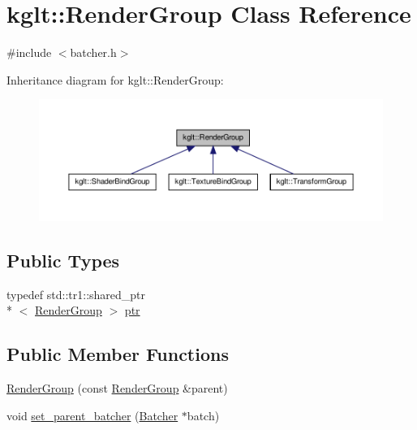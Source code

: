 \hypertarget{classkglt_1_1_render_group}{\section{kglt\-:\-:Render\-Group Class Reference}
\label{classkglt_1_1_render_group}
}


{\ttfamily \#include $<$batcher.\-h$>$}



Inheritance diagram for kglt\-:\-:Render\-Group\-:\nopagebreak
\begin{figure}[H]
\begin{center}
\leavevmode
\includegraphics[width=350pt]{classkglt_1_1_render_group__inherit__graph}
\end{center}
\end{figure}
\subsection*{Public Types}
\begin{DoxyCompactItemize}
\item 
typedef std\-::tr1\-::shared\-\_\-ptr\\*
$<$ \hyperlink{classkglt_1_1_render_group}{Render\-Group} $>$ \hyperlink{classkglt_1_1_render_group_a7b8a655ebd37b7189599be38ee838586}{ptr}
\end{DoxyCompactItemize}
\subsection*{Public Member Functions}
\begin{DoxyCompactItemize}
\item 
\hyperlink{classkglt_1_1_render_group_aa5d52551e53afcfc5189100d8deb6766}{Render\-Group} (const \hyperlink{classkglt_1_1_render_group}{Render\-Group} \&parent)
\item 
void \hyperlink{classkglt_1_1_render_group_a802a8e7605c454eed97fbc59023df878}{set\-\_\-parent\-\_\-batcher} (\hyperlink{classkglt_1_1_batcher}{Batcher} $\ast$batch)
\end{DoxyCompactItemize}


